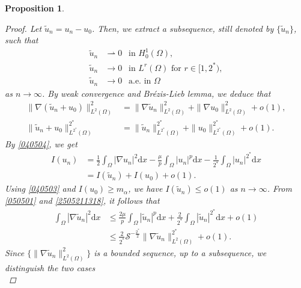 \documentclass[10pt]{article}
\numberwithin{equation}{section}
\newtheorem{proposition}[theorem]{Proposition}
\newcommand{\ud}{\mathrm{d}}
\numberwithin{equation}{section}
\begin{document}
\begin{proposition}
\begin{proof}
Let $\tilde{u}_n=u_n-u_0$. Then, we extract a subsequence, still denoted by $\{\tilde{u}_n\}$, such that
\begin{equation}\label{2505211318}
\begin{aligned}
\tilde{u}_n&\rightharpoonup 0 ~~\text{ in } H^1_0(\Omega), \\
\tilde{u}_n&\rightarrow 0 ~~\text{ in } L^{r}(\Omega) \text{ for } r\in[1,2^{*}),\\
\tilde{u}_n&\rightarrow 0 ~~\text{ a.e.}\text{ in }\Omega
\end{aligned}
\end{equation}
as $n \rightarrow \infty$. By weak convergence and Br\'{e}zis-Lieb lemma, we deduce that
\begin{equation}\label{040504}
\begin{aligned}
\|\nabla (\tilde{u}_n+u_0)\|^2_{L^{2}(\Omega)}
&=\|\nabla \tilde{u}_n\|^2_{L^{2}(\Omega)}+\|\nabla u_0\|^2_{L^{2}(\Omega)}+o(1), \\
\|\tilde{u}_n+u_0\|^{2^{*}}_{L^{2^{*}}(\Omega)}
&=\|\tilde{u}_n\|^{2^{*}}_{L^{2^{*}}(\Omega)}+\|u_0\|^{2^{*}}_{L^{2^{*}}(\Omega)}+o(1).
\end{aligned}
\end{equation}
By \eqref{040504}, we get
\begin{equation*}
\begin{aligned}
I(u_n)&=\frac{1}{2}\int_{\Omega}|\nabla u_n|^2 \ud x
-\frac{\mu}{p}\int_{\Omega}|u_n|^{p} \ud x
-\frac{1}{2^{*}}\int_{\Omega}|u_n|^{2^{*}} \ud x\\
&=I(\tilde{u}_n)+I(u_0)+o(1).
\end{aligned}
\end{equation*}
Using \eqref{040503} and $I(u_0)\geq m_{\alpha}$, we have $I(\tilde{u}_n)\leq o(1)$ as $n \rightarrow \infty$. From \eqref{050501} and \eqref{2505211318}, it follows that
\begin{equation}\label{050604}
\begin{aligned}
\int_{\Omega}|\nabla \tilde{u}_n|^2 \ud x
&\leq\frac{2\mu}{p}\int_{\Omega}|\tilde{u}_n|^{p} \ud x
+\frac{2}{2^{*}}\int_{\Omega}|\tilde{u}_n|^{2^{*}} \ud x+o(1)\\
&\le\frac{2}{2^{*}}\mathcal{S}^{-\frac{2^{*}}{2}}\|\nabla \tilde{u}_n\|^{2^{*}}_{L^{2}(\Omega)}+o(1).
\end{aligned}
\end{equation}
Since $\{\|\nabla \tilde{u}_n\|^{2}_{L^{2}(\Omega)}\}$ is a bounded sequence, up to a subsequence, we distinguish the two cases
\begin{equation*}

\end{equation*}
\end{proof}
\end{proposition}
\end{document}
